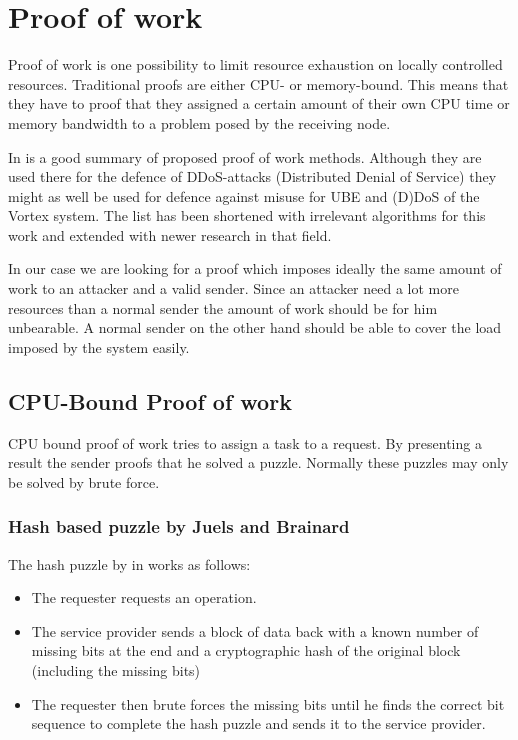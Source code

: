 \section{Proof of work}
Proof of work is one possibility to limit resource exhaustion on locally controlled resources. Traditional proofs are either CPU- or memory-bound. This means that they have to proof that they assigned a certain amount of their own CPU time or memory bandwidth to a problem posed by the receiving node.

In \cite{amiri2015theoretical} is a good summary of proposed proof of work methods. Although they are used there for the defence of DDoS-attacks (Distributed Denial of Service) they might as well be used for defence against misuse for UBE and (D)DoS of the Vortex system. The list has been shortened with irrelevant algorithms for this work and extended with newer research in that field.

In our case we are looking for a proof which imposes ideally the same amount of work to an attacker and a valid sender. Since an attacker need a lot more resources than a normal sender the amount of work should be for him unbearable. A normal sender on the other hand should be able to cover the load imposed by the system easily.

\subsection{CPU-Bound Proof of work}
CPU bound proof of work tries to assign a task to a request. By presenting a result the sender proofs that he solved a puzzle. Normally these puzzles may only be solved by brute force.

\subsubsection{Hash based puzzle by Juels and Brainard} 
The hash puzzle by \citeauthor{juels1999client} in \cite{juels1999client} works as follows: 
\begin{itemize}
	\item The requester requests an operation.
	\item The service provider sends a block of data back with a known number of missing bits at the end and a cryptographic hash of the original block (including the missing bits)
	\item The requester then brute forces the missing bits until he finds the correct bit sequence to complete the hash puzzle and sends it to the service provider.
\end{itemize}

